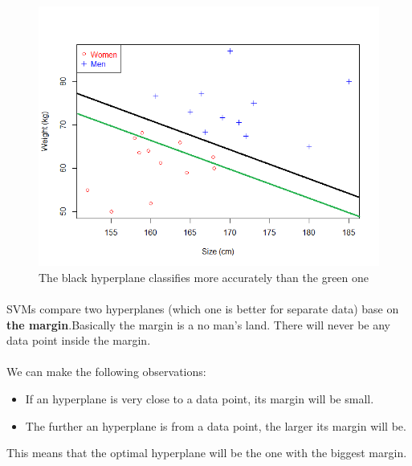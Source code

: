 \begin{figure}[h!]
	\centering
	\includegraphics[width=\linewidth]{images/svm/compare_hyperplanes.png}
	\caption[Compare hyperplanes in SVMs]{The black hyperplane classifies more accurately than the green one}
\end{figure}

\paragraph*{}
SVMs compare two hyperplanes (which one is better for separate data) base on \textbf{the margin}.Basically the margin is a no man's land. There will never be any data point inside the margin. 

\paragraph*{}
We can make the following observations:
\begin{itemize}
	\item If an hyperplane is very close to a data point, its margin will be small.
	\item The further an hyperplane is from a data point, the larger its margin will be.
\end{itemize}
This means that the optimal hyperplane will be the one with the biggest margin.

